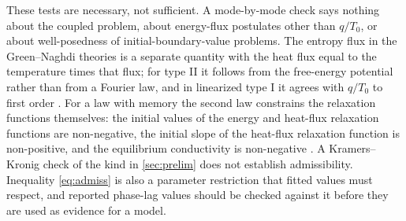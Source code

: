 These tests are necessary, not sufficient. A mode-by-mode check says nothing about the coupled problem, about energy-flux postulates other than $q/T_0$, or about well-posedness of initial-boundary-value problems. The entropy flux in the Green--Naghdi theories is a separate quantity with the heat flux equal to the temperature times that flux; for type II it follows from the free-energy potential rather than from a Fourier law, and in linearized type I it agrees with $q/T_0$ to first order \citep{Green1993}. For a law with memory the second law constrains the relaxation functions themselves: the initial values of the energy and heat-flux relaxation functions are non-negative, the initial slope of the heat-flux relaxation function is non-positive, and the equilibrium conductivity is non-negative \citep{ChenNunziato1974}. A Kramers--Kronig check of the kind in \cref{sec:prelim} does not establish admissibility. Inequality \eqref{eq:admiss} is also a parameter restriction that fitted values must respect, and reported phase-lag values should be checked against it before they are used as evidence for a model.
